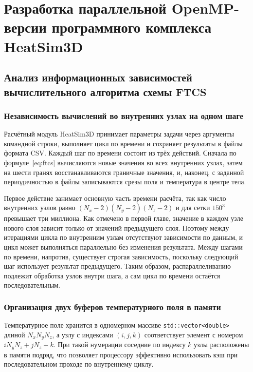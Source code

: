 \chapter{Разработка параллельной OpenMP-версии программного комплекса HeatSim3D}

\section{Анализ информационных зависимостей вычислительного алгоритма схемы FTCS}

\subsection{Независимость вычислений во внутренних узлах на одном шаге}

Расчётный модуль HeatSim3D принимает параметры задачи через аргументы командной строки, выполняет цикл по времени и сохраняет результаты в файлы формата CSV. Каждый шаг по времени состоит из трёх действий. Сначала по формуле~\eqref{eq:ftcs} вычисляются новые значения во всех внутренних узлах, затем на шести гранях восстанавливаются граничные значения, и, наконец, с заданной периодичностью в файлы записываются срезы поля и температура в центре тела.

Первое действие занимает основную часть времени расчёта, так как число внутренних узлов равно $(N_x - 2)(N_y - 2)(N_z - 2)$ и для сетки $150^3$ превышает три миллиона. Как отмечено в первой главе, значение в каждом узле нового слоя зависит только от значений предыдущего слоя. Поэтому между итерациями цикла по внутренним узлам отсутствуют зависимости по данным, и цикл может выполняться параллельно без изменения результата. Между шагами по времени, напротив, существует строгая зависимость, поскольку следующий шаг использует результат предыдущего. Таким образом, распараллеливанию подлежит обработка узлов внутри шага, а сам цикл по времени остаётся последовательным.

\subsection{Организация двух буферов температурного поля в памяти}

Температурное поле хранится в одномерном массиве \texttt{std::vector<double>} длиной $N_x N_y N_z$, а узлу с индексами $(i, j, k)$ соответствует элемент с номером $i N_y N_z + j N_z + k$. При такой нумерации соседние по индексу $k$ узлы расположены в памяти подряд, что позволяет процессору эффективно использовать кэш при последовательном проходе по внутреннему циклу.

